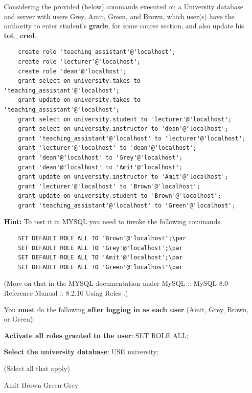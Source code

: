 \documentclass[12pt, addpoints]{exam}
\begin{document}
\begin{questions}
\begin{minipage}{\linewidth}
\question[4]
Considering the provided (below) commands executed on a University database and server with users Grey, Amit, Green, and Brown, 
which user(s) have the authority to enter student's \textbf{grade}, for some course section, and also update his \textbf{tot\_cred}.\par
\begin{verbatim}
    create role 'teaching_assistant'@'localhost';
    create role 'lecturer'@'localhost';
    create role 'dean'@'localhost';
    grant select on university.takes to 'teaching_assistant'@'localhost';
    grant update on university.takes to 'teaching_assistant'@'localhost';
    grant select on university.student to 'lecturer'@'localhost';
    grant select on university.instructor to 'dean'@'localhost';
    grant 'teaching_assistant'@'localhost' to 'lecturer'@'localhost';
    grant 'lecturer'@'localhost' to 'dean'@'localhost';
    grant 'dean'@'localhost' to 'Grey'@'localhost';
    grant 'dean'@'localhost' to 'Amit'@'localhost';
    grant update on university.instructor to 'Amit'@'localhost';
    grant 'lecturer'@'localhost' to 'Brown'@'localhost';
    grant update on university.student to 'Brown'@'localhost';
    grant 'teaching_assistant'@'localhost' to 'Green'@'localhost';
\end{verbatim}
\textbf{Hint: } To test it in MYSQL you need to invoke the following commands.\par
\begin{verbatim}
    SET DEFAULT ROLE ALL TO 'Brown'@'localhost';\par
    SET DEFAULT ROLE ALL TO 'Grey'@'localhost';\par
    SET DEFAULT ROLE ALL TO 'Amit'@'localhost';\par
    SET DEFAULT ROLE ALL TO 'Green'@'localhost'\par
\end{verbatim}
(More on that in the MYSQL documentation under MySQL :: MySQL 8.0 Reference Manual :: 8.2.10 Using Roles .)\par\vspace{0.5em}
You \textbf{must} do the following \textbf{after logging in as each user} (Amit, Grey, Brown, or Green):\par\vspace{0.5em}
\textbf{Activate all roles granted to the user}: SET ROLE ALL;\par
\textbf{Select the university database}: USE university;\par
(Select all that apply)\par\vspace{0.5em}
\begin{checkboxes}
    \choice Amit
    \CorrectChoice Brown
    \choice Green
    \choice Grey
\end{checkboxes}
\end{minipage}\vspace{1em}


\end{questions}
\end{document}

